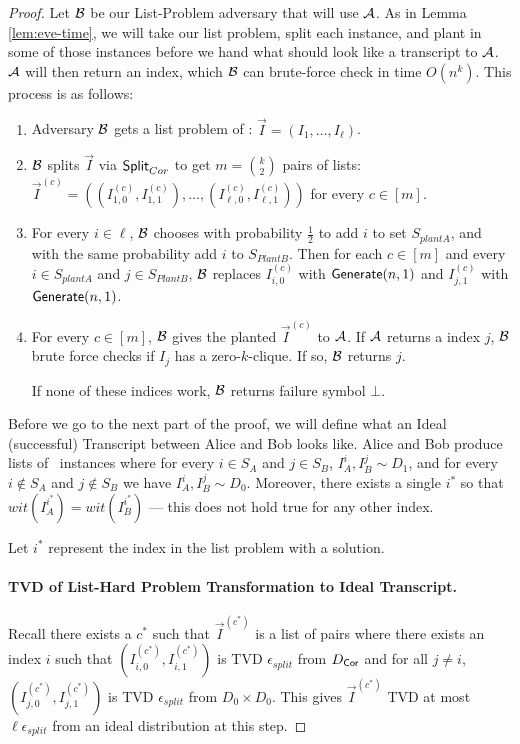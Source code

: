 \begin{proof}
	Let ${\cal B}$ be our List-Problem adversary that will use $\mathcal{A}$. As in Lemma \ref{lem:eve-time}, we will take our list problem, split each instance, and plant in some of those instances before we hand what should look like a transcript to $\mathcal{A}$. $\mathcal{A}$ will then return an index, which ${\cal B}$ can brute-force check in time $O(n^k)$. This process is as follows:
	\begin{enumerate}
		\item Adversary ${\cal B}$ gets a list problem of \zkclique: $\vec I = ( I_1, \ldots, I_\ell )$.
		\item ${\cal B}$ splits $\vec I$ via $\mathsf{Split}_{Cor}$ to get $m = \binom k 2$ pairs of lists: $\vec I^{(c)} = ( (I_{1,0}^{(c)}, I_{1,1}^{(c)}), \ldots,  (I_{\ell,0}^{(c)}, I_{\ell,1}^{(c)}))$ for every $c \in [m]$.
		\item For every $i \in \ell$, ${\cal B}$ chooses with probability $\frac 1 2$ to add $i$ to set $S_{plantA}$, and with the same probability add $i$ to $S_{PlantB}$.
		Then for each $c \in [m]$ and every $i \in S_{plantA}$ and $j \in S_{PlantB}$, ${\cal B}$ replaces $I_{i, 0}^{(c)}$ with $\mathsf{Generate}(n,1)$ and $I_{j, 1}^{(c)}$ with $\mathsf{Generate}(n,1)$.
		
		\item For every $c \in [m]$, ${\cal B}$ gives the planted $\vec I^{(c)}$ to $\mathcal{A}$. If $\mathcal{A}$ returns a index $j$, ${\cal B}$ brute force checks if $I_j$ has a zero-$k$-clique. If so, ${\cal B}$ returns $j$.
		
		If none of these indices work, ${\cal B}$ returns failure symbol $\bot$.
	\end{enumerate}
	
	Before we go to the next part of the proof, we will define what an Ideal (successful) Transcript between Alice and Bob looks like. Alice and Bob produce lists of \zkclique~instances where for every $i \in S_A$ and $j \in S_B$, $I_A^i, I_B^j \sim D_1$, and for every $i \not\in S_A$ and $j \not\in S_B$ we have $I_A^i, I_B^j \sim D_0$. Moreover, there exists a single $i^*$ so that $wit(I_A^{i^*}) = wit(I_B^{i^*})$ --- this does not hold true for any other index.
	
	Let $i^*$ represent the index in the list problem with a solution.
	
	\paragraph{TVD of List-Hard Problem Transformation to Ideal Transcript.}
	Recall there exists a $c^*$ such that $\vec I^{(c^*)}$ is a list of pairs where there exists an index $i$ such that $(I_{i,0}^{(c^*)}, I_{i,1}^{(c^*)})$ is TVD $\epsilon_{split}$ from $D_{\mathsf{Cor}}$ and for all $j \neq i$, $(I_{j,0}^{(c^*)}, I_{j,1}^{(c^*)})$ is TVD $\epsilon_{split}$ from $D_0\times D_0$. This gives $\vec I^{(c^*)}$ TVD at most $\ell \epsilon_{split}$ from an ideal distribution at this step.
	

\end{proof}
